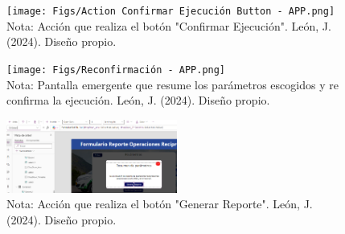 \documentclass[letter,oneside,12pt,spanish]{report}
\begin{document}
\begin{figure}[ht]
    \centering
    \texttt{[image: Figs/Action Confirmar Ejecución Button - APP.png]}
    \label{fig:ActionButtonConfirmar}
    \\Nota: Acción que realiza el botón "Confirmar Ejecución". León, J. (2024). Diseño propio.
\end{figure}

\begin{figure}[ht]
    \centering
    \texttt{[image: Figs/Reconfirmación - APP.png]}
    \label{fig:ReconfirmarScreen}
    \\Nota: Pantalla emergente que resume los parámetros escogidos y re confirma la ejecución. León, J. (2024). Diseño propio.
\end{figure}

\begin{figure}[ht]
    \centering
    \includegraphics[width=0.5\textwidth]{Figs/Action Generar Reporte Button - APP.png}
    \label{fig:ActionGenerate}
    \\Nota: Acción que realiza el botón "Generar Reporte". León, J. (2024). Diseño propio.
\end{figure}
\end{document}
